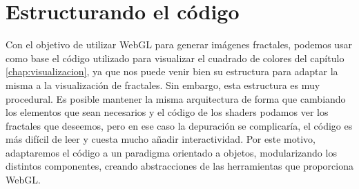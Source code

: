 \section{Estructurando el código}
\label{section:codigo}

Con el objetivo de utilizar WebGL para generar imágenes fractales, podemos usar como base el código utilizado para visualizar el cuadrado de colores del capítulo \ref{chap:visualizacion}, ya que nos puede venir bien su estructura para adaptar la misma a la visualización de fractales. Sin embargo, esta estructura es muy procedural. Es posible mantener la misma arquitectura de forma que cambiando los elementos que sean necesarios y el código de los shaders podamos ver los fractales que deseemos, pero en ese caso la depuración se complicaría, el código es más difícil de leer y cuesta mucho añadir interactividad. Por este motivo, adaptaremos el código a un paradigma orientado a objetos, modularizando los distintos componentes, creando abstracciones de las herramientas que proporciona WebGL.

